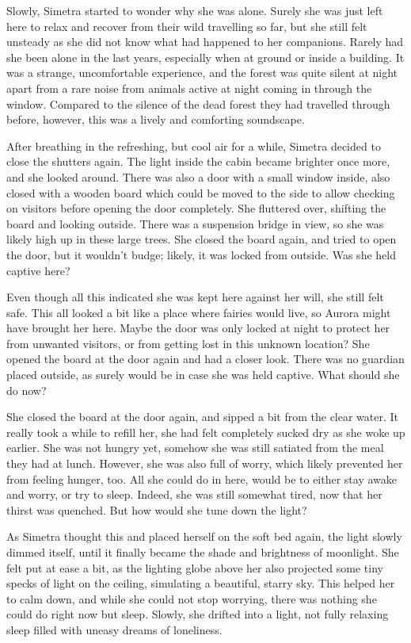 Slowly, Simetra started to wonder why she was alone. Surely she was just left here to relax and recover from their wild travelling so far, but she still felt unsteady as she did not know what had happened to her companions. Rarely had she been alone in the last years, especially when at ground or inside a building. It was a strange, uncomfortable experience, and the forest was quite silent at night apart from a rare noise from animals active at night coming in through the window. Compared to the silence of the dead forest they had travelled through before, however, this was a lively and comforting soundscape. 

After breathing in the refreshing, but cool air for a while, Simetra decided to close the shutters again. The light inside the cabin became brighter once more, and she looked around. There was also a door with a small window inside, also closed with a wooden board which could be moved to the side to allow checking on visitors before opening the door completely. She fluttered over, shifting the board and looking outside. There was a suspension bridge in view, so she was likely high up in these large trees. She closed the board again, and tried to open the door, but it wouldn't budge; likely, it was locked from outside. Was she held captive here?

Even though all this indicated she was kept here against her will, she still felt safe. This all looked a bit like a place where fairies would live, so Aurora might have brought her here. Maybe the door was only locked at night to protect her from unwanted visitors, or from getting lost in this unknown location? She opened the board at the door again and had a closer look. There was no guardian placed outside, as surely would be in case she was held captive. What should she do now?

She closed the board at the door again, and sipped a bit from the clear water. It really took a while to refill her, she had felt completely sucked dry as she woke up earlier. She was not hungry yet, somehow she was still satiated from the meal they had at lunch. However, she was also full of worry, which likely prevented her from feeling hunger, too. All she could do in here, would be to either stay awake and worry, or try to sleep. Indeed, she was still somewhat tired, now that her thirst was quenched. But how would she tune down the light?

As Simetra thought this and placed herself on the soft bed again, the light slowly dimmed itself, until it finally became the shade and brightness of moonlight. She felt put at ease a bit, as the lighting globe above her also projected some tiny specks of light on the ceiling, simulating a beautiful, starry sky. This helped her to calm down, and while she could not stop worrying, there was nothing she could do right now but sleep. Slowly, she drifted into a light, not fully relaxing sleep filled with uneasy dreams of loneliness.

